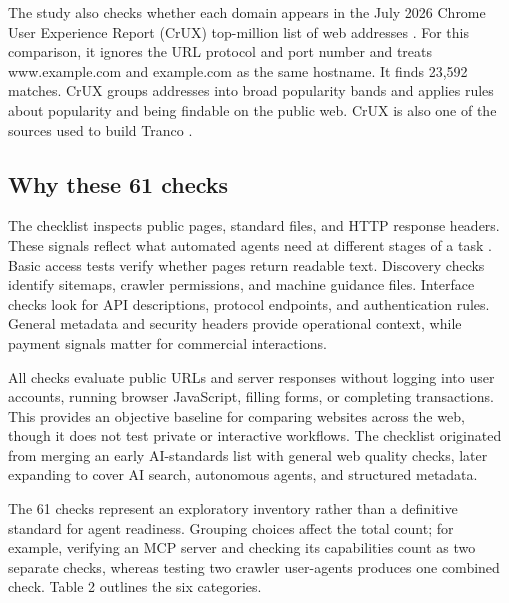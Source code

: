 \documentclass{article}
\begin{document}
The study also checks whether each domain appears in the July 2026 Chrome User Experience Report (CrUX) top-million list of web addresses \cite{ref2,ref3}. For this comparison, it ignores the URL protocol and port number and treats www.example.com and example.com as the same hostname. It finds 23,592 matches. CrUX groups addresses into broad popularity bands and applies rules about popularity and being findable on the public web. CrUX is also one of the sources used to build Tranco \cite{ref28}.

\subsection{Why these 61 checks}

The checklist inspects public pages, standard files, and HTTP response headers. These signals reflect what automated agents need at different stages of a task \cite{ref31}. Basic access tests verify whether pages return readable text. Discovery checks identify sitemaps, crawler permissions, and machine guidance files. Interface checks look for API descriptions, protocol endpoints, and authentication rules. General metadata and security headers provide operational context, while payment signals matter for commercial interactions.

All checks evaluate public URLs and server responses without logging into user accounts, running browser JavaScript, filling forms, or completing transactions. This provides an objective baseline for comparing websites across the web, though it does not test private or interactive workflows. The checklist originated from merging an early AI-standards list with general web quality checks, later expanding to cover AI search, autonomous agents, and structured metadata.

The 61 checks represent an exploratory inventory rather than a definitive standard for agent readiness. Grouping choices affect the total count; for example, verifying an MCP server and checking its capabilities count as two separate checks, whereas testing two crawler user-agents produces one combined check. Table 2 outlines the six categories.
\end{document}
